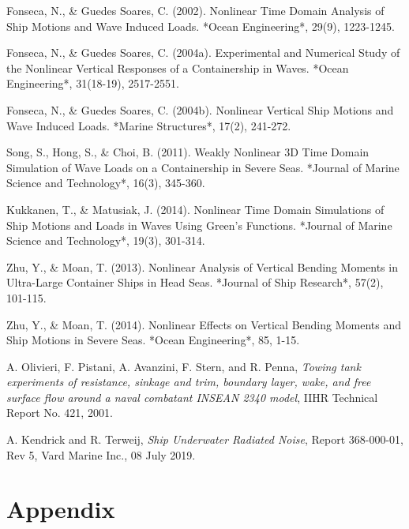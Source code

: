 \documentclass[12pt]{article} %
\begin{document}
\begin{thebibliography}{99}
     Fonseca, N., \& Guedes Soares, C. (2002). Nonlinear Time Domain Analysis of Ship Motions and Wave Induced Loads. *Ocean Engineering*, 29(9), 1223-1245.

     Fonseca, N., \& Guedes Soares, C. (2004a). Experimental and Numerical Study of the Nonlinear Vertical Responses of a Containership in Waves. *Ocean Engineering*, 31(18-19), 2517-2551.

     Fonseca, N., \& Guedes Soares, C. (2004b). Nonlinear Vertical Ship Motions and Wave Induced Loads. *Marine Structures*, 17(2), 241-272.

     Song, S., Hong, S., \& Choi, B. (2011). Weakly Nonlinear 3D Time Domain Simulation of Wave Loads on a Containership in Severe Seas. *Journal of Marine Science and Technology*, 16(3), 345-360.

     Kukkanen, T., \& Matusiak, J. (2014). Nonlinear Time Domain Simulations of Ship Motions and Loads in Waves Using Green's Functions. *Journal of Marine Science and Technology*, 19(3), 301-314.

     Zhu, Y., \& Moan, T. (2013). Nonlinear Analysis of Vertical Bending Moments in Ultra-Large Container Ships in Head Seas. *Journal of Ship Research*, 57(2), 101-115.

     Zhu, Y., \& Moan, T. (2014). Nonlinear Effects on Vertical Bending Moments and Ship Motions in Severe Seas. *Ocean Engineering*, 85, 1-15.

    A. Olivieri, F. Pistani, A. Avanzini, F. Stern, and R. Penna, \emph{Towing tank experiments of resistance, sinkage and trim, boundary layer, wake, and free surface flow around a naval combatant INSEAN 2340 model}, IIHR Technical Report No. 421, 2001.
    
    A. Kendrick and R. Terweij, \emph{Ship Underwater Radiated Noise}, Report 368-000-01, Rev 5, Vard Marine Inc., 08 July 2019.   
    
    
\end{thebibliography}

\section{Appendix}
\end{document}
